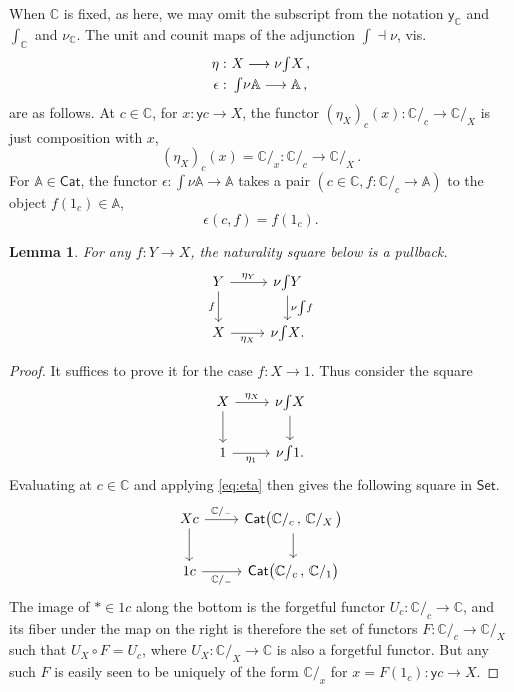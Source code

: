 \documentclass[11pt]{article}
\newcommand{\C}{\ensuremath{\mathbb{C}}}
\newcommand{\A}{\ensuremath{\mathbb{A}}}
\newcommand{\Set}{\ensuremath{\mathsf{Set}}}
\newcommand{\Cat}{\ensuremath{\mathsf{Cat}}}
\newcommand{\y}{\ensuremath{\mathsf{y}}} %
\newcommand{\yon}{\ensuremath{\mathsf{y}}} %
\newcommand{\ra}{\ensuremath{\rightarrow}}
\renewcommand{\to}{\ensuremath{\rightarrow}}
\newcommand{\too}{\ensuremath{\longrightarrow}}
\newcommand{\elem}[1]{\textstyle\int\!{#1}}
\newtheorem{lemma}[theorem]{Lemma}
\theoremstyle{remark}
\theoremstyle{definition}
\begin{document}
When $\C$ is fixed, as here, we may omit the subscript from the notation $\yon_\C$ and  $\int_\C$ and $\nu_\C$.  The unit and counit maps of the adjunction $\int \dashv \nu$, vis.\
\begin{align*}\textstyle
\eta :&\ \textstyle  X \too \nu{\elem{X}}\,, \\
\epsilon :&\ \textstyle  \elem\nu\A \too \A\,,
\end{align*}
 are as follows.  At $c\in\C$, for $x : \y{c}\ra X$, the functor $(\eta_X)_c(x) : \C/_c \to \C/_X$ is just composition with $x$, 
\begin{equation}\label{eq:eta}
(\eta_X)_c(x) = \C/_x : \C/_c \too \C/_X\,.
\end{equation}
For $\A\in\Cat$, the functor $ \epsilon : \int\nu\A \to \A$ takes a pair $(c\in\C, f : \C/_c \to \A)$ to the object $f(1_c) \in \A$,
\[
\epsilon(c,f) = f(1_c).
\]
\begin{lemma}\label{lemma:natpb}
For any $f : Y\to X$, the naturality square below is a pullback.
\begin{equation}\label{eq:naturality}\textstyle
\begin{tikzcd}
	 Y \ar[d, swap,"f"] \ar[r, "{\eta_Y}"] & \nu{\int\!{Y}} \ar[d, "{ \nu{\int\!{f}}}"]\\  
	X \ar[r, swap,"{\eta_X}"] &   \nu{\int\!{X}}.
 \end{tikzcd}
 \end{equation}
\end{lemma}

\begin{proof}
It suffices to prove it for the case $f : X\ra 1$.  Thus consider the square 
\begin{equation}\label{eq:naturalityobject}\textstyle
\begin{tikzcd}
	 X \ar[d] \ar[r, "{\eta_X}"] & \nu{\int\!{X}} \ar[d]\\  
	1\ar[r, swap,"{\eta_1}"] &   \nu{\int\! 1}.
 \end{tikzcd}
 \end{equation}
Evaluating at $c\in\C$ and applying \eqref{eq:eta} then gives the following square in $\Set$.
\begin{equation}\label{eq:naturalityobjecteval}\textstyle
\begin{tikzcd}
	 Xc \ar[d] \ar[r, "{\C/_{-}}"] & \Cat\big( {\C/_c}\,,\, {\C/_X}\, \big) \ar[d]\\  
	1c\ar[r, swap, "{\C/_{-}}"] &   \Cat\big( {\C/_c}\,,\, \C/_1 \big)
 \end{tikzcd}
 \end{equation}
The image of $*\in 1c$ along the bottom is the forgetful functor $U_c : \C/_c\to \C$, and its fiber under the map on the right is therefore the set of functors $F : {\C/_c}\to {\C/_X}$ such that $U_X\circ F = U_c$, where $U_X : \C/_X\to \C$ is also a forgetful functor. But any such $F$ is easily seen to be uniquely of the form $\C/_{x}$ for $x = F(1_c) : \y{c} \to X$.
\end{proof}
\end{document}
